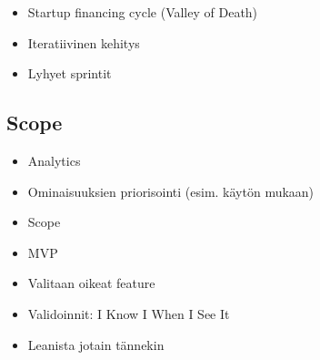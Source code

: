  \begin{itemize}

 \item Startup financing cycle (Valley of Death)
 \item Iteratiivinen kehitys
 \item Lyhyet sprintit
 
 \end{itemize}
 
 \subsection{Scope}
 
 \begin{itemize}
 
 \item Analytics
 \item Ominaisuuksien priorisointi (esim. käytön mukaan)
 \item Scope
 \item MVP
 \item Valitaan oikeat feature
 \item Validoinnit: I Know I When I See It
 \item Leanista jotain tännekin
 
 \end{itemize}
 
